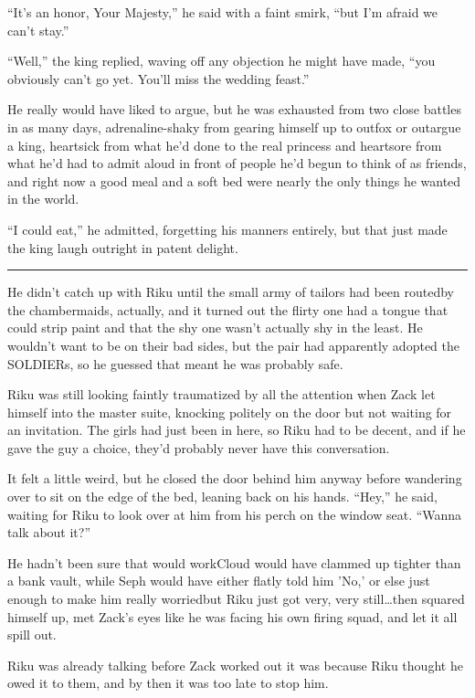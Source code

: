 ``It's an honor, Your Majesty,'' he said with a faint smirk, ``but I'm afraid we can't stay.''

``Well,'' the king replied, waving off any objection he might have made, ``you obviously can't go yet. You'll miss the wedding feast.''

He really would have liked to argue, but he was exhausted from two close battles in as many days, adrenaline-shaky from gearing himself up to outfox or outargue a king, heartsick from what he'd done to the real princess and heartsore from what he'd had to admit aloud in front of people he'd begun to think of as friends, and right now a good meal and a soft bed were nearly the only things he wanted in the world.

``I could eat,'' he admitted, forgetting his manners entirely, but that just made the king laugh outright in patent delight.

\fancybreak{\pfbreakdisplay}


He didn't catch up with Riku until the small army of tailors had been routed\textemdash by the chambermaids, actually, and it turned out the flirty one had a tongue that could strip paint and that the shy one wasn't actually shy in the least. He wouldn't want to be on their bad sides, but the pair had apparently adopted the SOLDIERs, so he guessed that meant he was probably safe.

Riku was still looking faintly traumatized by all the attention when Zack let himself into the master suite, knocking politely on the door but not waiting for an invitation. The girls had just been in here, so Riku had to be decent, and if he gave the guy a choice, they'd probably never have this conversation.

It felt a little weird, but he closed the door behind him anyway before wandering over to sit on the edge of the bed, leaning back on his hands. ``Hey,'' he said, waiting for Riku to look over at him from his perch on the window seat. ``Wanna talk about it?''

He hadn't been sure that would work\textemdash Cloud would have clammed up tighter than a bank vault, while Seph would have either flatly told him 'No,' or else just enough to make him really worried\textemdash but Riku just got very, very still\ldots then squared himself up, met Zack's eyes like he was facing his own firing squad, and let it all spill out.

Riku was already talking before Zack worked out it was because Riku thought he owed it to them, and by then it was too late to stop him.

